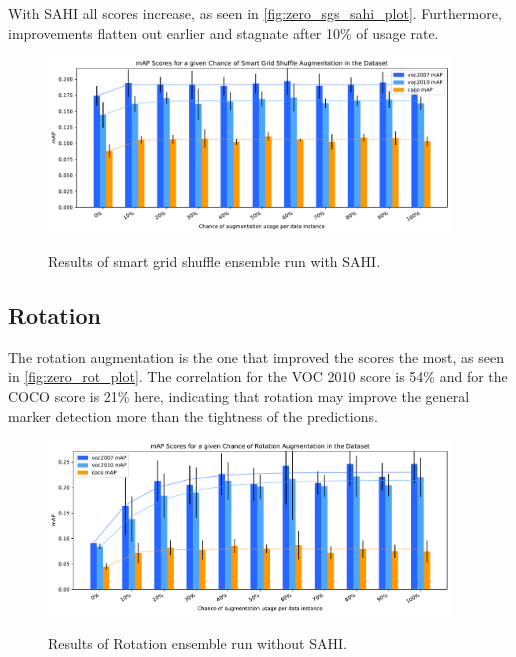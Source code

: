 \documentclass[10pt]{book}
\newcommand{\figureref}[1]{\autoref{#1}}
\begin{document}
With \ac{SAHI} all scores increase, as seen in \figureref{fig:zero_sgs_sahi_plot}. Furthermore, improvements flatten out earlier and stagnate after 10\% of usage rate.

\begin{figure}
  \caption{Results of smart grid shuffle ensemble run with \ac{SAHI}.}
  \includegraphics[width=0.95\textwidth]{image/zero-based-sgs-sahi-ensemble-2-thesis-2}
  \label{fig:zero_sgs_sahi_plot}
\end{figure}

\subsection{Rotation}

The rotation augmentation is the one that improved the scores the most, as seen in \figureref{fig:zero_rot_plot}. The correlation for the VOC 2010 score is 54\% and for the \ac{COCO} score is 21\% here, indicating that rotation may improve the general marker detection more than the tightness of the predictions. %

\begin{figure}
  \caption{Results of Rotation ensemble run without \ac{SAHI}.}
  \includegraphics[width=0.95\textwidth]{image/zero-based-rot-ensemble-2-thesis-2}
  \label{fig:zero_rot_plot}
\end{figure}
\end{document}
